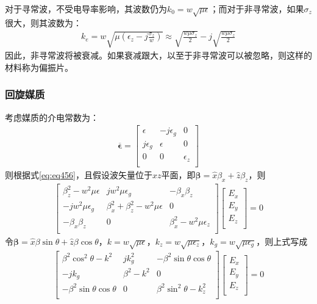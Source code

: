 \documentclass{article}
\numberwithin{equation}{section}
\renewcommand{\vec}[1]{\boldsymbol{#1}}
\begin{document}
对于寻常波，不受电导率影响，其波数仍为$k_0=w\sqrt{\mu\epsilon}$；而对于非寻常波，如果$\sigma_z$很大，则其波数为：
\begin{align}
    \label{eq:eq482}
    k_e=w\sqrt{\mu(\epsilon_z-j\frac{\sigma_z}{w})}\approx\sqrt{\frac{w\mu\sigma_z}{2}}-j\sqrt{\frac{w\mu\sigma_z}{2}}
\end{align}
因此，非寻常波将被衰减。如果衰减跟大，以至于非寻常波可以被忽略，则这样的材料称为偏振片。
\subsubsection{回旋媒质}
考虑媒质的介电常数为：
\begin{align}
    \label{eq:eq483}
    \overline{\vec{\epsilon}}=
        \left[
            \begin{matrix}
                \epsilon & -j\epsilon_g & 0 \\
                j\epsilon_g & \epsilon & 0 \\
                0 & 0 & \epsilon_z \\
            \end{matrix}
        \right]
\end{align}
则根据式\ref{eq:eq456}，且假设波矢量位于$xz$平面，即$\vec{\beta}=\hat{x}\beta_x+\hat{z}\beta_z$，则
\begin{align}
    \label{eq:eq484}
    \left[
        \begin{matrix}
            \beta_z^2-w^2\mu\epsilon & jw^2\mu\epsilon_g & -\beta_x\beta_z \\
            -jw^2\mu\epsilon_g & \beta_x^2+\beta_z^2-w^2\mu\epsilon & 0 \\
            -\beta_x\beta_z & 0 & \beta_x^2-w^2\mu\epsilon_z \\
        \end{matrix}
    \right]
    \left[
        \begin{matrix}
            E_x \\
            E_y \\
            E_z \\
        \end{matrix}
    \right]=0
\end{align}
令$\vec{\beta}=\hat{x}\beta\sin\theta+\hat{z}\beta\cos\theta$，$k=w\sqrt{\mu\epsilon}$，$k_z=w\sqrt{\mu\epsilon_z}$，$k_g=w\sqrt{\mu\epsilon_g}$，则上式写成
\begin{align}
    \label{eq:eq485}
    \left[
        \begin{matrix}
            \beta^2\cos^2\theta-k^2 & jk^2_g & -\beta^2\sin\theta\cos\theta \\
            -jk_g & \beta^2-k^2 & 0 \\
            -\beta^2\sin\theta\cos\theta & 0 & \beta^2\sin^2\theta-k_z^2 \\
        \end{matrix}
    \right]
    \left[
        \begin{matrix}
            E_x \\
            E_y \\
            E_z \\
        \end{matrix}
    \right]=0
\end{align}
\end{document}
